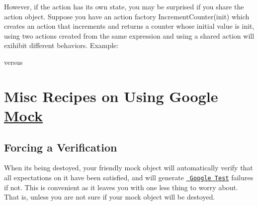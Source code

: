 \begin{DoxyCode}{0}
\end{DoxyCode}


However, if the action has its own state, you may be surprised if you share the action object. Suppose you have an action factory {\ttfamily Increment\+Counter(init)} which creates an action that increments and returns a counter whose initial value is {\ttfamily init}, using two actions created from the same expression and using a shared action will exihibit different behaviors. Example\+:


\begin{DoxyCode}{0}
\end{DoxyCode}


versus


\begin{DoxyCode}{0}
\DoxyCodeLine{}
\end{DoxyCode}


\section*{Misc Recipes on Using Google \mbox{\hyperlink{class_mock}{Mock}}}

\subsection*{Forcing a Verification}

When it\textquotesingle{}s being destoyed, your friendly mock object will automatically verify that all expectations on it have been satisfied, and will generate \href{http://code.google.com/p/googletest/}\texttt{ Google Test} failures if not. This is convenient as it leaves you with one less thing to worry about. That is, unless you are not sure if your mock object will be destoyed.

